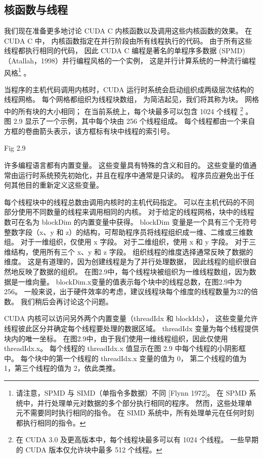 \subsection{核函数与线程}
我们现在准备更多地讨论 CUDA C 内核函数以及调用这些内核函数的效果。 在 CUDA C 中，
内核函数指定在并行阶段由所有线程执行的代码。 由于所有这些线程都执行相同的代码，
因此 CUDA C 编程是著名的单程序多数据 (SPMD)（Atallah，1998）并行编程风格的一个实例，
这是并行计算系统的一种流行编程风格\footnote{请注意，SPMD 与 SIMD（单指令多数据）不同 [Flynn 1972]。 
在 SPMD 系统中，并行处理单元对数据的多个部分执行相同的程序。 然而，这些处理单元不需要同时执行相同的指令。 
在 SIMD 系统中，所有处理单元在任何时刻都执行相同的指令。} 。

当程序的主机代码调用内核时，CUDA 运行时系统会启动组织成两级层次结构的线程网格。 每个网格都组织为线程块数组，
为简洁起见，我们将其称为块。 网格中的所有块的大小相同； 在当前系统上，每个块最多可以包含 1024 个线程
\footnote{在 CUDA 3.0 及更高版本中，每个线程块最多可以有 1024 个线程。 
一些早期的 CUDA 版本仅允许块中最多 512 个线程。} 。 
图 2.9 显示了一个示例，其中每个块由 256 个线程组成。 
每个线程都由一个来自方框的卷曲箭头表示，该方框标有块中线程的索引号。

{\color{red} Fig 2.9}

\begin{remark}[内置变量]
	许多编程语言都有内置变量。 这些变量具有特殊的含义和目的。 
	这些变量的值通常由运行时系统预先初始化，并且在程序中通常是只读的。 程序员应避免出于任何其他目的重新定义这些变量。
\end{remark}

每个线程块中的线程总数由调用内核时的主机代码指定。 可以在主机代码的不同部分使用不同数量的线程来调用相同的内核。 
对于给定的线程网格，块中的线程数可在名为 blockDim 的内置变量中获得。 
blockDim 变量是一个具有三个无符号整数字段（x、y 和 z）的结构，可帮助程序员将线程组织成一维、二维或三维数组。 
对于一维组织，仅使用 x 字段。 对于二维组织，使用 x 和 y 字段。 对于三维结构，使用所有三个 x、y 和 z 字段。 
组织线程的维度选择通常反映了数据的维度。 这是有道理的，因为创建线程是为了并行处理数据，
因此线程的组织很自然地反映了数据的组织。 在图2.9中，每个线程块被组织为一维线程数组，因为数据是一维向量。 
blockDim.x变量的值表示每个块中的线程总数，在图2.9中为256。 
一般来说，出于硬件效率的考虑，建议线程块每个维度的线程数量为32的倍数。 我们稍后会再讨论这个问题。

CUDA 内核可以访问另外两个内置变量（threadIdx 和 blockIdx），
这些变量允许线程彼此区分并确定每个线程要处理的数据区域。 threadIdx 变量为每个线程提供块内的唯一坐标。 
在图2.9中，由于我们使用一维线程组织，因此仅使用threadIdx.x。 
每个线程的 threadIdx.x 值显示在图 2.9 中每个线程的小阴影框中。 每个块中的第一个线程的 threadIdx.x 变量的值为 0，
第二个线程的值为 1，第三个线程的值为 2，依此类推。

